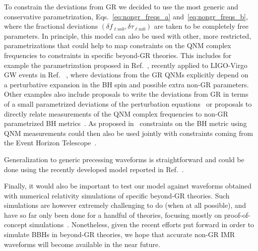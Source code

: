 To constrain the deviations from GR we decided to use the most generic and conservative parametrization, Eqs.~\eqref{eq:nongr_freqs_a} and~\eqref{eq:nongr_freqs_b}, where the fractional deviations $(\delta f_{\ell m0},\delta \tau_{\ell m0})$ are taken to be completely free parameters. In principle, this model can also be used with other, more restricted, parametrizations that could help to map constraints on the QNM complex frequencies to constraints in specific beyond-GR theories. This includes for example the parametrization proposed in Ref.~\cite{Maselli:2019mjd}, recently applied to LIGO-Virgo GW events in Ref. ~\cite{Carullo:2021dui}, where deviations from the GR QNMs explicitly depend on a perturbative expansion in the BH spin and possible extra non-GR parameters. Other examples also include proposals to write the deviations from GR in terms of a small parametrized deviations of the perturbation equations~\cite{Cardoso:2019mqo,McManus:2019ulj} or proposals to directly relate measurements of the QNM complex frequencies to non-GR parametrized BH metrics~\cite{Suvorov:2021amy,Volkel:2020daa}. As proposed in~\cite{Volkel:2020daa,Volkel:2020xlc} constraints on the BH metric using QNM measurements could then also be used jointly with constraints coming from the Event Horizon Telescope~\cite{Volkel:2020xlc,Psaltis:2020lvx}.

Generalization to generic precessing waveforms is straightforward and could be done using the recently developed model reported in Ref.~\cite{Ossokine:2020kjp}. 

Finally, it would also be important to test our model against waveforms obtained with numerical relativity simulations of specific beyond-GR theories. Such simulations are however extremely challenging to do (when at all possible), and have so far only been done for a handful of theories, focusing mostly on proof-of-concept simulations~\cite{Healy:2011ef,Berti:2013gfa,Cao:2013osa,Okounkova:2017yby,Hirschmann:2017psw,Witek:2018dmd,Okounkova:2019dfo,Okounkova:2019zjf,Okounkova:2020rqw,East:2020hgw}. Nonetheless, given the recent efforts put forward in order to simulate BBHs in beyond-GR theories, we hope that accurate non-GR IMR waveforms will become available in the near future.